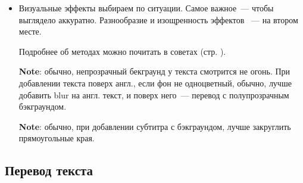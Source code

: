 \documentclass[
a4paper, %
12pt, %
article,
onecolumn, %
openany, %
]{memoir}
\begin{document}
\begin{itemize}
    \item Визуальные эффекты выбираем по ситуации.
        Самое важное~--- чтобы выглядело аккуратно. Разнообразие и изощренность
        эффектов ~--- на втором месте.

        Подробнее об методах можно почитать в советах (стр. \pageref{advices}).

        \textbf{Note}: обычно, непрозрачный бекграунд у текста
        смотрится не огонь. При добавлении текста поверх англ.,
        если фон не одноцветный, обычно, лучше добавить blur на англ.
        текст, и поверх него~--- перевод с полупрозрачным бэкграундом.

        \textbf{Note}: обычно, при добавлении субтитра с
        бэкграундом, лучше закруглить прямоугольные края.
\end{itemize}



\subsection{Перевод текста}
\end{document}

